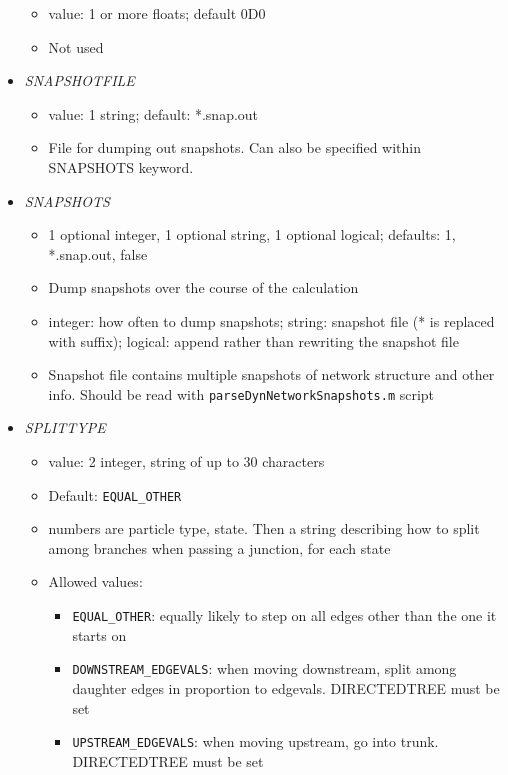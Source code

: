 \documentclass[12pt]{article}
\begin{document}
\begin{itemize}
\begin{itemize}
	\item  value: 1 or more floats; default 0D0
	\item Not used
\end{itemize}
%
\item {\it SNAPSHOTFILE}
    \begin{itemize}
      \item  value: 1 string; default: *.snap.out
      \item File for dumping out snapshots. Can also be specified within SNAPSHOTS keyword.
    \end{itemize}
%
\item {\it SNAPSHOTS}
\begin{itemize}
	\item 1 optional integer, 1 optional string, 1 optional logical; defaults: 1, *.snap.out, false
	\item Dump snapshots over the course of the calculation
	\item integer: how often to dump snapshots; string: snapshot file (* is replaced with suffix); logical: append rather than rewriting the snapshot file
	\item Snapshot file contains multiple snapshots of network structure and other info. Should be read with \verb=parseDynNetworkSnapshots.m= script
\end{itemize}
%
\item {\it SPLITTYPE}
\begin{itemize}
	\item value: 2 integer, string of up to 30 characters
	\item Default: \verb=EQUAL_OTHER=
	\item numbers are particle type, state. Then a string describing how to split among branches when passing a junction, for each state
	\item Allowed values: 
	\begin{itemize}
		\item \verb=EQUAL_OTHER=: equally likely to step on all edges other than the one it starts on
		\item \verb=DOWNSTREAM_EDGEVALS=: when moving downstream, split among daughter edges in proportion to edgevals. DIRECTEDTREE must be set
		\item \verb=UPSTREAM_EDGEVALS=: when moving upstream, go into trunk. DIRECTEDTREE must be set
	\end{itemize}
\end{itemize}


\end{itemize}
\end{document}
